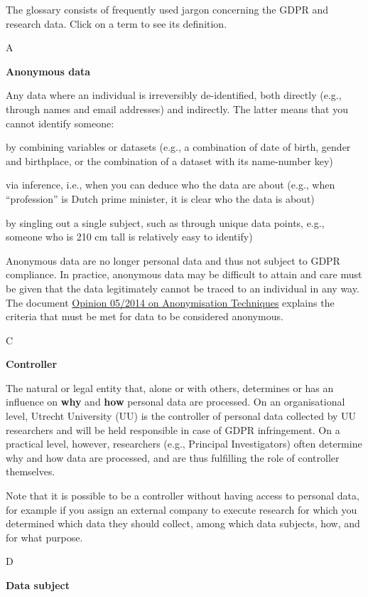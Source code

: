 \documentclass[
]{book}
\begin{document}
The glossary consists of frequently used jargon concerning the GDPR and
research data. Click on a term to see its definition.

A

\textbf{Anonymous data}

Any data where an individual is irreversibly de-identified, both directly (e.g., through names and email addresses) and indirectly. The latter means that you cannot identify someone:

by combining variables or datasets (e.g., a combination of date of birth, gender and birthplace, or the combination of a dataset with its name-number key)

via inference, i.e., when you can deduce who the data are about (e.g., when ``profession'' is Dutch prime minister, it is clear who the data is about)

by singling out a single subject, such as through unique data points, e.g., someone who is 210 cm tall is relatively easy to identify)

Anonymous data are no longer personal data and thus not subject to GDPR
compliance. In practice, anonymous data may be difficult to attain and care must be given that the data legitimately cannot be traced to an individual in any way. The document \href{https://ec.europa.eu/justice/article-29/documentation/opinion-recommendation/files/2014/wp216_en.pdf}{Opinion 05/2014 on Anonymisation Techniques} explains the criteria that must be met for data to be considered anonymous.

C

\textbf{Controller}

The natural or legal entity that, alone or with others, determines or has an influence on \textbf{why} and \textbf{how} personal data are processed. On an organisational level, Utrecht University (UU) is the controller of personal data collected by UU researchers and will be held responsible in case of GDPR
infringement. On a practical level, however, researchers (e.g., Principal Investigators) often determine why and how data are processed, and are thus fulfilling the role of controller themselves.

Note that it is possible to be a controller without having access to personal data, for example if you assign an external company to execute research for which you determined which data they should collect, among which data subjects, how, and for what purpose.

D

\textbf{Data subject}
\end{document}
